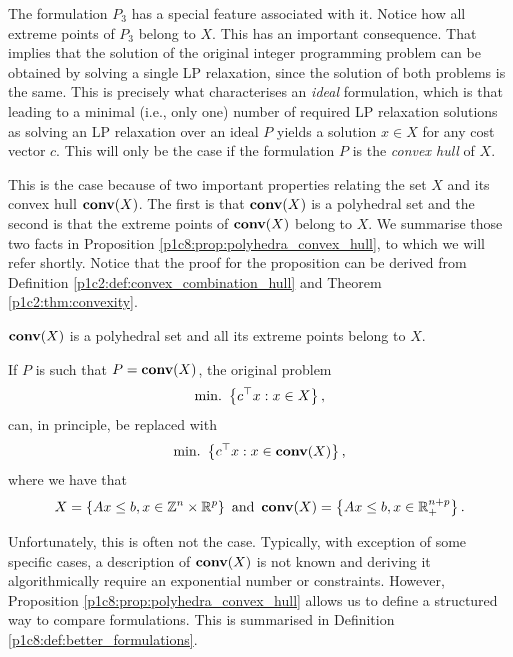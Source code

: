 The formulation $P_3$ has a special feature associated with it. Notice how all extreme points of $P_3$ belong to $X$. This has an important consequence. That implies that the solution of the original integer programming problem can be obtained by solving a single LP relaxation, since the solution of both problems is the same. This is precisely what characterises an \emph{ideal} formulation, which is that leading to a minimal (i.e., only one) number of required LP relaxation solutions as solving an LP relaxation over an ideal $P$ yields a solution $x \in X$ for any cost vector $c$. This will only be the case if the formulation $P$ is the \emph{convex hull} of $X$.

This is the case because of two important properties relating the set $X$ and its convex hull $\mathop{\bf conv}(X)$. The first is that $\mathop{\bf conv}(X)$ is a polyhedral set and the second is that the extreme points of $\mathop{\bf conv}(X)$ belong to $X$. We summarise those two facts in Proposition \ref{p1c8:prop:polyhedra_convex_hull}, to which we will refer shortly. Notice that the proof for the proposition can be derived from Definition \ref{p1c2:def:convex_combination_hull} and Theorem \ref{p1c2:thm:convexity}.
  
\begin{proposition}\label{p1c8:prop:polyhedra_convex_hull}
	$\mathop{\bf conv}(X)$ is a polyhedral set and all its extreme points belong to $X$. 
\end{proposition}

 
If $P$ is such that $P = \mathop{\bf conv} (X)$, the original problem 
%
\begin{equation*}
	\mathop{\text{min.~}}\left\{ c^\top x : x \in X \right \},
\end{equation*}
%
can, in principle, be replaced with 
%
\begin{equation*}
	\mathop{\text{min.~}}\left\{  c^\top x : x \in \mathop{\bf conv}(X) \right \},	
\end{equation*}
%
where we have that 
%
\begin{equation*}
	X = \left\{ Ax \leq b, x \in \mathbb{Z}^n \times \mathbb{R}^p \right \} \text{ and } \mathop{\bf conv}(X) = \left\{ Ax \leq b, x \in \mathbb{R}_+^{n+p} \right \}.	
\end{equation*}

Unfortunately, this is often not the case. Typically, with exception of some specific cases, a description of $\mathop{\bf conv}(X)$ is not known and deriving it algorithmically require an exponential number or constraints. However, Proposition \ref{p1c8:prop:polyhedra_convex_hull} allows us to define a structured way to compare formulations. This is summarised in Definition \ref{p1c8:def:better_formulations}.

